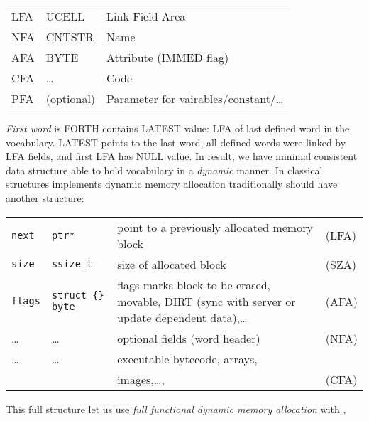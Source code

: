 \clearpage
{}\label{uvocab}

\begin{tabular}{l l l}
LFA & UCELL & Link Field Area \\
NFA & CNTSTR & Name \\
AFA & BYTE & Attribute (IMMED flag) \\
CFA & \ldots & Code \\
PFA & (optional) & Parameter for vairables/constant/\ldots\\
\end{tabular}

\medskip\noindent
\emph{First word} is FORTH contains
LATEST value: LFA of last defined word in the vocabulary. LATEST points to the
last word, all defined words were linked by LFA fields, and first LFA has NULL
value. In result, we have minimal consistent data structure able to hold
vocabulary in a \emph{dynamic} manner.
In classical structures implements dynamic memory allocation traditionally
should have another structure:

\medskip\noindent
\begin{tabular}{l p{1.8cm} p{5.9cm} p{1cm}}
\verb|next| & \verb|ptr*| & point to a previously allocated memory
block&(LFA)\\
\verb|size| & \verb|ssize_t| & size of allocated block & (SZA) \\
\verb|flags| & \verb|struct {}| \verb|byte| & flags marks block to be
erased, movable, DIRT (sync with server or update dependent
data),\ldots&(AFA)\\
\ldots & \ldots & optional fields (word header)& (NFA) \\
\ldots & \ldots & executable bytecode, arrays,\\&& images,\ldots, & (CFA) \\ 
\end{tabular}

\noindent
This full structure let us use \emph{full functional dynamic memory allocation}
with ,